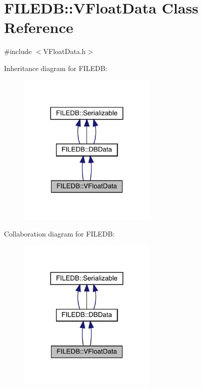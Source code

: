 \hypertarget{classFILEDB_1_1VFloatData}{}\section{F\+I\+L\+E\+DB\+:\+:V\+Float\+Data Class Reference}
\label{classFILEDB_1_1VFloatData}


{\ttfamily \#include $<$V\+Float\+Data.\+h$>$}



Inheritance diagram for F\+I\+L\+E\+DB\+:
\nopagebreak
\begin{figure}[H]
\begin{center}
\leavevmode
\includegraphics[width=188pt]{d3/d86/classFILEDB_1_1VFloatData__inherit__graph}
\end{center}
\end{figure}


Collaboration diagram for F\+I\+L\+E\+DB\+:
\nopagebreak
\begin{figure}[H]
\begin{center}
\leavevmode
\includegraphics[width=188pt]{d8/d08/classFILEDB_1_1VFloatData__coll__graph}
\end{center}
\end{figure}
